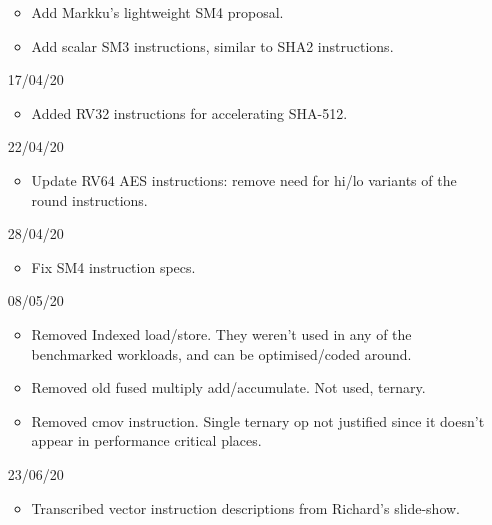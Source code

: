 \begin{itemize}
\begin{itemize}
    \item Add Markku's lightweight SM4 proposal.
    \item Add scalar SM3 instructions, similar to SHA2 instructions.
\end{itemize}
\item[17/04/20] \begin{itemize}
    \item Added RV32 instructions for accelerating SHA-512.
\end{itemize}
\item[22/04/20] \begin{itemize}
    \item Update RV64 AES instructions: remove need for hi/lo variants of
          the round instructions.
\end{itemize}
\item[28/04/20] \begin{itemize}
    \item Fix SM4 instruction specs. 
\end{itemize}
\item[08/05/20] \begin{itemize}
    \item Removed Indexed load/store. They weren't used in any of the
          benchmarked workloads, and can be optimised/coded around.
    \item Removed old fused multiply add/accumulate. Not used, ternary.
    \item Removed cmov instruction. Single ternary op not justified since
          it doesn't appear in performance critical places.
\end{itemize}
\item[23/06/20] \begin{itemize}
    \item Transcribed vector instruction descriptions from Richard's
          slide-show.
\end{itemize}
\end{itemize}
